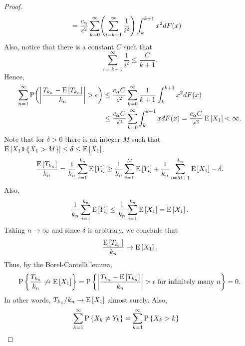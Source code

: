 \begin{proof}
\begin{equation*}
\begin{split}
            &= \frac{c_\alpha}{\epsilon^2}\sum_{k=0}^\infty\pth{\sum_{i=k+1}^\infty\frac{1}{i^2}}\int_k^{k+1}x^2dF(x)
        \end{split}
    \end{equation*}
    Also, notice that there is a constant $C$ such that 
    \begin{equation*}
        \sum_{i=k+1}^\infty\frac{1}{i^2} \leq \frac{C}{k+1}. 
    \end{equation*}
    Hence, 
    \begin{equation*}
        \begin{split}
            \sum_{n=1}^\infty \P\pth{\abs{\frac{T_{k_n} - \E\sbrc{T_{k_n}}}{k_n}}>\epsilon} 
            &\leq \frac{c_\alpha C}{\epsilon^2}\sum_{k=0}^\infty\frac{1}{k+1}\int_k^{k+1}x^2dF(x) \\
            &\leq \frac{c_\alpha C}{\epsilon^2}\sum_{k=0}^\infty\int_k^{k+1}xdF(x) 
            = \frac{c_\alpha C}{\epsilon^2}\E\sbrc{X_1}<\infty. 
        \end{split}
    \end{equation*}
    Note that for $\delta>0$ there is an integer $M$ such that 
    $\operatorname{E}\left[ {X_1\mathbf{1}\left\{ {X_1> M} \right\}} \right]\leq\delta\leq\operatorname{E}\left[ {X_1} \right]$. 
    \begin{equation*}
        \frac{\operatorname{E}\left[ {T_{k_n}} \right]}{k_n} = \frac{1}{k_n}\sum_{i=1}^{k_n} \operatorname{E}\left[ {Y_i} \right]
        \geq \frac{1}{k_n}\sum_{i=1}^{M} \operatorname{E}\left[ {Y_i} \right] + \frac{1}{k_n}\sum_{i=M+1}^{k_n}\operatorname{E}\left[ {X_1} \right]-\delta.
    \end{equation*}
    Also, 
    \begin{equation*}
        \frac{1}{k_n}\sum_{i=1}^{k_n}\operatorname{E}\left[ {Y_i} \right]\leq \frac{1}{k_n}\sum_{i=1}^{k_n}\operatorname{E}\left[ {X_1} \right] = \operatorname{E}\left[ {X_1} \right]. 
    \end{equation*}
    Taking $n\to\infty$ and since $\delta$ is arbitrary, we 
    conclude that 
    \begin{equation*}
        \frac{\operatorname{E}\left[ {T_{k_n}} \right]}{k_n}\to \operatorname{E}\left[ {X_1} \right]. 
    \end{equation*}
    Thus, by the Borel-Cantelli lemma, 
    \begin{equation*}
        \operatorname{P}\left\{ {\frac{T_{k_n}}{k_n}\not\to\operatorname{E}\left[ {X_1} \right]} \right\} = \operatorname{P}\left\{ {\left\lvert {\frac{T_{k_n} - \operatorname{E}\left[ {T_{k_n}} \right]}{k_n}} \right\rvert>\epsilon\text{ for infinitely many $n$}} \right\} = 0. 
    \end{equation*}
    In other words, $T_{k_n}/k_n\to\operatorname{E}\left[ {X_1} \right]$ almost surely. 
    Also, 
    \begin{equation*}
        \begin{split}
            \sum_{k=1}^\infty \P\set{X_k\neq Y_k} &= \sum_{k=1}^\infty \P\set{X_k>k} 

\end{split}
\end{equation*}
\end{proof}
